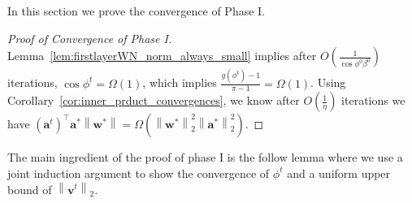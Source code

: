 \documentclass{article}
\newcommand{\firstlayer}{w}
\newcommand{\firstlayerWN}{v}
\newcommand{\secondlayer}{a}
\newcommand{\vect}[1]{\mathbf{#1}}
\newcommand{\norm}[1]{\left\|#1\right\|}
\begin{document}
In this section we prove the convergence of Phase I.
\begin{proof}[Proof of Convergence of Phase I]
Lemma~\ref{lem:firstlayerWN_norm_always_small} implies after $O\left(\frac{1}{\cos \phi^0 \beta^0}\right)$ iterations, $\cos \phi^t = \Omega\left(1\right)$, which implies $\frac{g(\phi^t)-1}{\pi-1} = \Omega\left(1\right)$.
Using Corollary~\ref{cor:inner_prduct_convergences}, we know after $O\left(\frac{1}{\eta}\right)$ iterations we have $\left(\vect{\secondlayer}^t\right)^\top \vect{\secondlayer}^*\norm{\vect{\firstlayer}^*} = \Omega\left(\norm{\vect{\firstlayer}^*}_2^2\norm{\vect{\secondlayer}^*}_2^2\right)$.
\end{proof}
The main ingredient of the proof of phase I is the follow lemma where we use a joint induction argument to show the convergence of $\phi^t$ and a uniform upper bound of $\norm{\vect{\firstlayerWN}^t}_2$.
\end{document}
